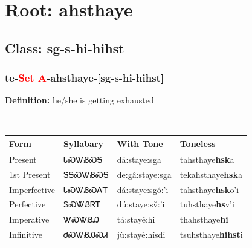 \needspace{4in}
\section*{Root: ahsthaye}
\nopagebreak
{}
\needspace{3in}
\subsection*{Class: sg-s-hi-hihst}
\nopagebreak
\needspace{2in}
\subsubsection*{te{-}\textcolor{Red}{Set A}{-}\textbf{ahsthaye}{-}[sg-s-hi-hihst]}
\nopagebreak
\textbf{Definition: } he/she is getting exhausted
\\[0.5em]
\begin{tabularx}{\textwidth}{l X X X}%
\toprule%
\textbf{Form}&\textbf{Syllabary}&\textbf{With Tone}&\textbf{Toneless}\\%
\midrule%
Present&ᏓᏍᏔᏰᏍᎦ&dá:staye:sga&tahsthaye\textbf{hsk}a\\%
1st Present&ᏕᎦᏍᏔᏰᏍᎦ&de:gâ:staye:sga&tekahsthaye\textbf{hsk}a\\%
Imperfective&ᏓᏍᏔᏰᏍᎪᎢ&dá:staye:sgó:’i&tahsthaye\textbf{hsk}o'i\\%
Perfective&ᏚᏍᏔᏰᏒᎢ&dú:staye:sv̌:’i&tuhsthaye\textbf{hs}v'i\\%
Imperative&ᏔᏍᏔᏰᎯ&tá:stayě:hi&thahsthaye\textbf{hi}\\%
Infinitive&ᏧᏍᏔᏰᎯᏍᏗ&jù:stayě:hísdi&tsuhsthaye\textbf{hihst}i\\%
\bottomrule%
\end{tabularx}
\\[1em]